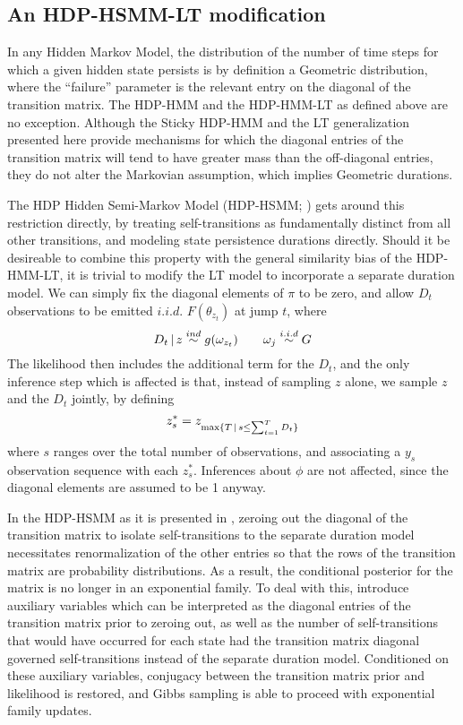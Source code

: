 \subsection{An HDP-HSMM-LT modification}
\label{sec:an-hsmm-modification}

In any Hidden Markov Model, the distribution of the number of time
steps for which a given hidden state persists is by definition
a Geometric distribution, where the ``failure'' parameter is the
relevant entry on the diagonal of the transition matrix.  The HDP-HMM
and the HDP-HMM-LT as defined above are no exception.  Although the
Sticky HDP-HMM \cite{fox2008hdp} and the LT
generalization presented here provide mechanisms for which the
diagonal entries of the transition matrix will tend to have greater
mass than the off-diagonal entries, they do not alter the Markovian
assumption, which implies Geometric durations.

The HDP Hidden Semi-Markov Model (HDP-HSMM;
\citet{johnson2013bayesian}) 
gets around this restriction directly, by treating self-transitions as
fundamentally distinct from all other transitions, and modeling state
persistence durations directly.  Should it be desireable to combine
this property with the general similarity bias of the HDP-HMM-LT, 
it is trivial to modify the LT model to incorporate a separate duration model.
We can simply fix the diagonal
elements of $\pi$ to be zero, and allow $D_t$ observations to be
emitted $i.i.d.$ $F(\theta_{z_t})$ at jump $t$, where
\begin{equation}
  \label{eq:95}
  D_t \, \vert \, z \stackrel{ind}{\sim} g(\omega_{z_t}) \qquad \omega_j
  \stackrel{i.i.d}{\sim} G
\end{equation}
The likelihood then includes the additional term for the $D_t$, and
the only inference step which is affected is that, instead of sampling
$z$ alone, we sample $z$ and the $D_t$ jointly, by defining
\begin{equation}
  z^*_s = z_{\max\{T \, \vert \, s \leq \sum_{t=1}^T D_t\}}
\end{equation}
where $s$ ranges over the total number of observations, 
and associating a $y_s$ observation sequence with each $z^*_s$.
Inferences about $\phi$ are not affected, since the diagonal
elements are assumed to be 1 anyway.

In the HDP-HSMM as it is presented in \cite{johnson2013bayesian},
zeroing out the diagonal of the transition matrix to isolate
self-transitions to the separate duration model necessitates
renormalization of the other entries so that the rows of the
transition matrix are probability distributions.  As a result, the
conditional posterior for the matrix is no longer in 
an exponential family.  To deal with this, \citeauthor{johnson2013bayesian}
introduce auxiliary
variables which can be interpreted as the diagonal entries of the 
transition matrix prior to zeroing out, as well as the number of
self-transitions that would have occurred for each state had the
transition matrix diagonal governed self-transitions instead of the
separate duration model.  Conditioned on these auxiliary variables,
conjugacy between the transition matrix prior and likelihood is
restored, and Gibbs sampling is able to proceed with exponential
family updates.

